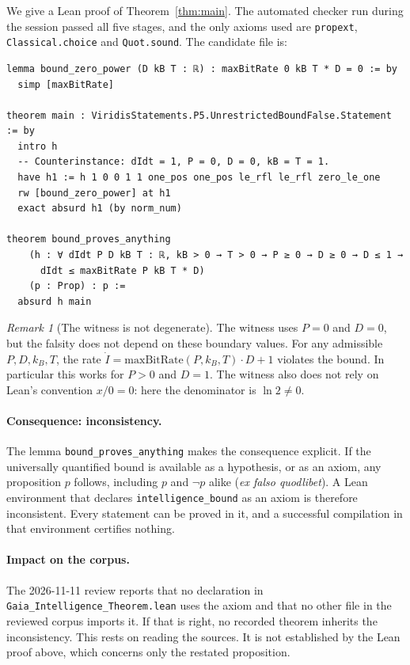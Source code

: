 \documentclass[11pt]{article}
\theoremstyle{remark}
\newtheorem{remark}{Remark}
\begin{document}
We give a Lean proof of Theorem~\ref{thm:main}. The automated checker run during the session
passed all five stages, and the only axioms used are \texttt{propext}, \texttt{Classical.choice}
and \texttt{Quot.sound}. The candidate file is:
\begin{lstlisting}
lemma bound_zero_power (D kB T : ℝ) : maxBitRate 0 kB T * D = 0 := by
  simp [maxBitRate]

theorem main : ViridisStatements.P5.UnrestrictedBoundFalse.Statement := by
  intro h
  -- Counterinstance: dIdt = 1, P = 0, D = 0, kB = T = 1.
  have h1 := h 1 0 0 1 1 one_pos one_pos le_rfl le_rfl zero_le_one
  rw [bound_zero_power] at h1
  exact absurd h1 (by norm_num)

theorem bound_proves_anything
    (h : ∀ dIdt P D kB T : ℝ, kB > 0 → T > 0 → P ≥ 0 → D ≥ 0 → D ≤ 1 →
      dIdt ≤ maxBitRate P kB T * D)
    (p : Prop) : p :=
  absurd h main
\end{lstlisting}

\begin{remark}[The witness is not degenerate]
The witness uses $P=0$ and $D=0$, but the falsity does not depend on these boundary values. For
any admissible $P,D,k_B,T$, the rate $\dot I=\mathrm{maxBitRate}(P,k_B,T)\cdot D+1$ violates the
bound. In particular this works for $P>0$ and $D=1$. The witness also does not rely on Lean's
convention $x/0=0$: here the denominator is $\ln 2\neq0$.
\end{remark}

\paragraph{Consequence: inconsistency.} The lemma \texttt{bound\_proves\_anything} makes the
consequence explicit. If the universally quantified bound is available as a hypothesis, or as an
axiom, any proposition $p$ follows, including $p$ and $\neg p$ alike (\emph{ex falso
quodlibet}). A Lean environment that declares \texttt{intelligence\_bound} as an axiom is
therefore inconsistent. Every statement can be proved in it, and a successful compilation in that
environment certifies nothing.

\paragraph{Impact on the corpus.} The 2026-11-11 review reports that no declaration in
\texttt{Gaia\_Intelligence\_Theorem.lean} uses the axiom and that no other file in the reviewed
corpus imports it. If that is right, no recorded theorem inherits the inconsistency. This rests on
reading the sources. It is not established by the Lean proof above, which concerns only the
restated proposition.
\end{document}
